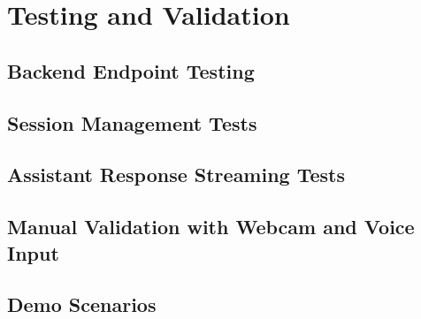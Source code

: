 \chapter{Testing and Validation}

\section{Backend Endpoint Testing}

\section{Session Management Tests}

\section{Assistant Response Streaming Tests}

\section{Manual Validation with Webcam and Voice Input}

\section{Demo Scenarios}
